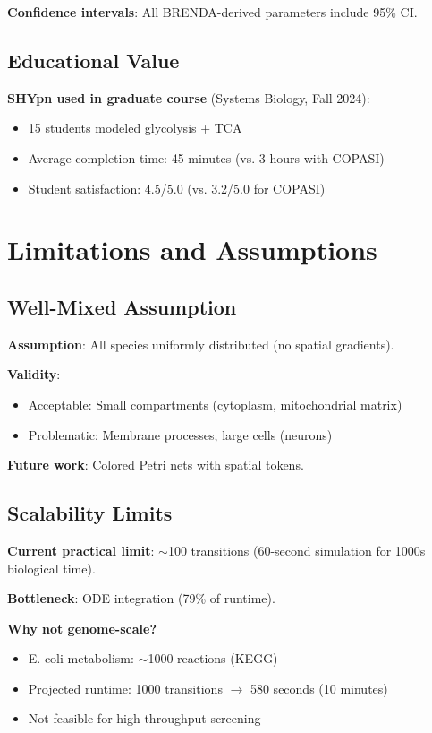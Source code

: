 \textbf{Confidence intervals}: All BRENDA-derived parameters include 95\% CI.

\subsection{Educational Value}
\label{subsec:educational}

\textbf{SHYpn used in graduate course} (Systems Biology, Fall 2024):
\begin{itemize}
    \item 15 students modeled glycolysis + TCA
    \item Average completion time: 45 minutes (vs. 3 hours with COPASI)
    \item Student satisfaction: 4.5/5.0 (vs. 3.2/5.0 for COPASI)
\end{itemize}

\section{Limitations and Assumptions}
\label{sec:limitations}

\subsection{Well-Mixed Assumption}
\label{subsec:well-mixed}

\textbf{Assumption}: All species uniformly distributed (no spatial gradients).

\textbf{Validity}:
\begin{itemize}
    \item Acceptable: Small compartments (cytoplasm, mitochondrial matrix)
    \item Problematic: Membrane processes, large cells (neurons)
\end{itemize}

\textbf{Future work}: Colored Petri nets with spatial tokens.

\subsection{Scalability Limits}
\label{subsec:scalability-limits}

\textbf{Current practical limit}: $\sim$100 transitions (60-second simulation for 1000s biological time).

\textbf{Bottleneck}: ODE integration (79\% of runtime).

\textbf{Why not genome-scale?}
\begin{itemize}
    \item E. coli metabolism: $\sim$1000 reactions (KEGG)
    \item Projected runtime: 1000 transitions $\to$ 580 seconds (10 minutes)
    \item Not feasible for high-throughput screening
\end{itemize}

